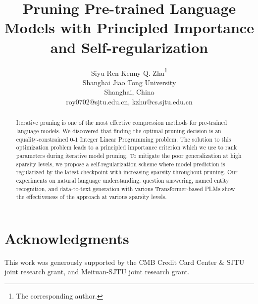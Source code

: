 \documentclass[11pt]{article}
\title{Pruning  Pre-trained Language Models with Principled Importance and Self-regularization}
\author{Siyu Ren \hspace*{1cm} Kenny Q. Zhu\textsuperscript{\rm}\thanks{\hspace{2mm}The corresponding author.}\\
	Shanghai Jiao Tong University\\
	Shanghai, China\\
	roy0702@sjtu.edu.cn, kzhu@cs.sjtu.edu.cn}
\begin{document}
	\maketitle
	\begin{abstract}
		 
Iterative pruning is one of the most effective compression methods for pre-trained language models. We discovered that finding the optimal pruning decision is an equality-constrained 0-1 Integer Linear Programming problem. 
The solution to this optimization problem leads to a principled importance criterion which we use to rank parameters during iterative model pruning.
To mitigate the poor generalization at high sparsity levels, we propose a self-regularization scheme 
where model prediction is regularized by the latest checkpoint with 
increasing sparsity throughout pruning. 
Our experiments on natural language understanding, 
question answering, named entity recognition, and data-to-text generation 
with various Transformer-based PLMs show the
effectiveness of the approach at various sparsity levels.
	\end{abstract}
	
	
%	
	
	
	
	
	

%	
\section*{Acknowledgments}
This work was generously supported by the CMB Credit Card Center \& SJTU
joint research grant, and Meituan-SJTU joint research grant.

	
	
	\newpage
	\appendix

%	
\end{document}
